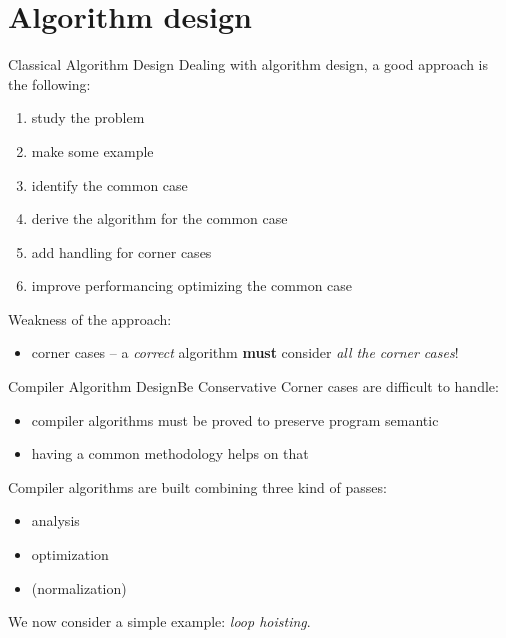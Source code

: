 \documentclass[10pt,mathserif]{beamer}
\begin{document}
\section{Algorithm design}
\begin{frame}{Classical Algorithm Design}
Dealing with algorithm design, a good approach is the following:
\begin{enumerate}
\item study the problem
\item make some example
\item identify the \alert{common case}
\item derive the algorithm for the common case
\item add handling for \alert{corner cases}
\item improve performancing \alert{optimizing the common case}
\end{enumerate}

\vfill
Weakness of the approach:
\begin{itemize}
\item \alert{corner cases} -- a \emph{correct} algorithm \textbf{must} consider \emph{all the corner cases}!
\end{itemize}
\end{frame}

\begin{frame}{Compiler Algorithm Design}{Be Conservative}
Corner cases are difficult to handle:

\begin{itemize}
\item compiler algorithms must be \alert{proved} to preserve program semantic
\item having a common methodology helps on that
\end{itemize}
\vfill
Compiler algorithms are built combining three kind of \alert{passes}:

\begin{itemize}
\item analysis
\item optimization
\item (normalization)
\end{itemize}

\pause
\vfill
We now consider a simple example: \emph{loop hoisting}.
\end{frame}
\end{document}

